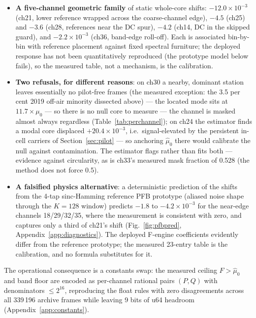 \begin{itemize}
  \item \textbf{A five-channel geometric family} of static whole-core
  shifts: $-12.0\times10^{-3}$ (ch21, lower reference wrapped across the
  coarse-channel edge), $-4.5$ (ch25) and $-3.6$ (ch28, references near the
  DC spur), $-4.2$ (ch14, DC in the skipped guard), and $-2.2\times10^{-3}$
  (ch36, band-edge roll-off).
  Each is associated bin-by-bin with reference placement against fixed
  spectral furniture; the deployed response has not been quantitatively
  reproduced (the prototype model below fails), so the measured table,
  not a mechanism, is the calibration.
  \item \textbf{Two refusals, for different reasons}: on ch30 a nearby,
  dominant station leaves essentially no pilot-free frames (the
  measured exception: the 3.5 per cent 2019 off-air minority dissected
  above) --- the
  located mode sits at $11.7\times\mu_0$ --- so there is no
  null core to measure --- the channel is masked almost always regardless
  (Table~\ref{tab:perchannel}); on ch24 the estimator finds a modal core
  displaced $+20.4\times10^{-3}$, i.e.\ signal-elevated by the
  persistent in-cell carriers of Section~\ref{sec:pilot} --- so
  anchoring $\hat\mu_0$ there would calibrate the null against
  contamination. The estimator flags rather than fits both --- evidence
  against circularity, as is ch33's measured mask fraction of 0.528 (the
  method does not force 0.5).
  \item \textbf{A falsified physics alternative}: a deterministic
  prediction of the shifts from the 4-tap sinc-Hamming reference PFB
  prototype (aliased noise shape through the $K=128$ window) predicts
  $-1.8$ to $-4.2\times10^{-3}$ for the near-edge channels 18/29/32/35,
  where the measurement is consistent with zero, and captures only a third
  of ch21's shift (Fig.~\ref{fig:pfbpred}, Appendix~\ref{app:diagnostics}).
  The deployed F-engine coefficients evidently differ from
  the reference prototype; the measured 23-entry table is the calibration,
  and no formula substitutes for it.
\end{itemize}

The operational consequence is a constants swap: the measured ceiling
$F > \hat\mu_0$ and band floor are encoded as per-channel rational pairs
$(P, Q)$ with denominators $\le 2^{16}$, reproducing the float rules with
zero disagreements across all 339\,196 archive frames while leaving 9 bits
of u64 headroom (Appendix~\ref{app:constants}).

